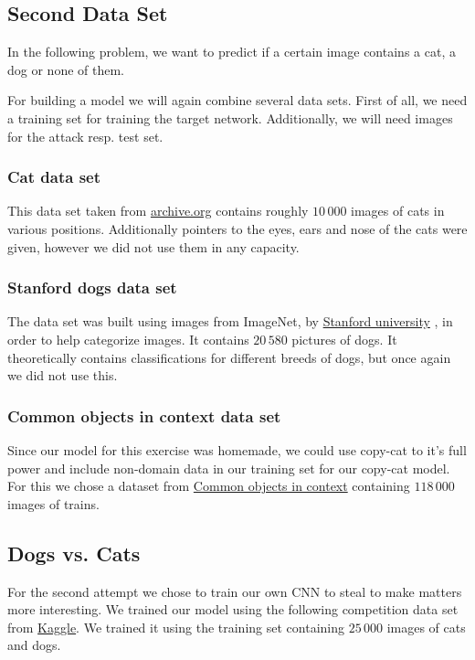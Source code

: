 \documentclass[a4paper,11pt]{article}
\begin{document}
    \subsection{Second Data Set}
        In the following problem, we want to predict if a certain image contains a cat, a dog or none of them. 
        
        For building a model we will again combine several data sets. First of all, we need a training set for training the target network. Additionally, we will need images for the attack resp. test set. 
        
        \subsubsection{Cat data set}
            This data set taken from \hyperlink{https://archive.org/details/CAT_DATASET}{archive.org} contains roughly $10\,000$ images of cats in various positions. Additionally pointers to the eyes, ears and nose of the cats were given, however we did not use them in any capacity. 
            
        \subsubsection{Stanford dogs data set }
            The data set was built using images from ImageNet, by \hyperlink{http://vision.stanford.edu/aditya86/ImageNetDogs/}{Stanford university} , in order to help categorize images. It contains $20\,580$ pictures of dogs. It theoretically contains classifications for different breeds of dogs, but once again we did not use this.
            
        \subsubsection{Common objects in context data set}
            Since our model for this exercise was homemade, we could use copy-cat to it's full power and include non-domain data in our training set for our copy-cat model. For this we chose a dataset from \hyperlink{https://cocodataset.org/\#download}{Common objects in context} containing $118\,000$ images of trains.
            
        
     \subsection{Dogs vs. Cats}
            For the second attempt we chose to train our own CNN to steal to make matters more interesting. We trained our model using the following competition data set from \hyperlink{https://www.kaggle.com/c/dogs-vs-cats/data}{Kaggle}. We trained it using the training set containing $25\,000$ images of cats and dogs. 
            
\end{document}
